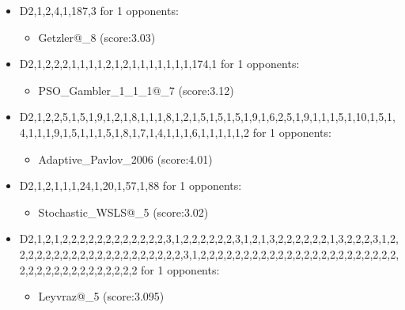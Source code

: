 \begin{appendices}
\begin{itemize}
        \item D2,1,2,4,1,187,3 for 1 opponents:
        \begin{multicols}{3}
            \begin{itemize}
                \item Getzler@\_8 (score:3.03)
            \end{itemize}
        \end{multicols}

        \item D2,1,2,2,2,1,1,1,1,2,1,2,1,1,1,1,1,1,1,174,1 for 1 opponents:
        \begin{multicols}{3}
            \begin{itemize}
                \item PSO\_Gambler\_1\_1\_1@\_7 (score:3.12)
            \end{itemize}
        \end{multicols}

        \item D2,1,2,2,5,1,5,1,9,1,2,1,8,1,1,1,8,1,2,1,5,1,5,1,5,1,9,1,6,2,5,1,9,1,1,1,5,1,10,1,5,1,4,1,1,1,9,1,5,1,1,1,5,1,8,1,7,1,4,1,1,1,6,1,1,1,1,1,2 for 1 opponents:
        \begin{multicols}{3}
            \begin{itemize}
                \item Adaptive\_Pavlov\_2006 (score:4.01)
            \end{itemize}
        \end{multicols}

        \item D2,1,2,1,1,1,24,1,20,1,57,1,88 for 1 opponents:
        \begin{multicols}{3}
            \begin{itemize}
                \item Stochastic\_WSLS@\_5 (score:3.02)
            \end{itemize}
        \end{multicols}

        \item D2,1,2,1,2,2,2,2,2,2,2,2,2,2,2,2,3,1,2,2,2,2,2,2,3,1,2,1,3,2,2,2,2,2,2,1,3,2,2,2,3,1,2,2,2,2,2,2,2,2,2,2,2,2,2,2,2,2,2,2,2,2,3,1,2,2,2,2,2,2,2,2,2,2,2,2,2,2,2,2,2,2,2,2,2,2,2,2,2,2,2,2,2,2,2,2,2,2,2,2,2 for 1 opponents:
        \begin{multicols}{3}
            \begin{itemize}
                \item Leyvraz@\_5 (score:3.095)
            \end{itemize}
        \end{multicols}


\end{itemize}
\end{appendices}
